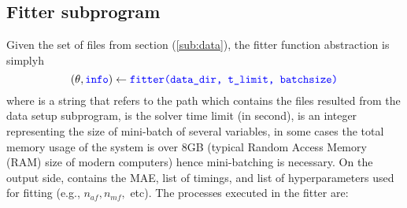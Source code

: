 \documentclass[12pt]{article}
\begin{document}
\subsection{Fitter subprogram}
\label{sub:}
Given the set of files from section (\ref{sub:data}), the fitter function abstraction is simplyh
\begin{equation}
	(\theta, \codeword{info}) \leftarrow \codeword{fitter(data_dir, t_limit, batchsize)}
\end{equation}
where  is a string that refers to the path which contains the files resulted from the data setup subprogram,  is the solver time limit (in second),  is an integer representing the size of mini-batch of several variables, in some cases the total memory usage of the system is over 8GB (typical Random Access Memory (RAM) size of modern computers) hence mini-batching is necessary. On the output side,  contains the MAE, list of timings, and list of hyperparameters used for fitting (e.g., $n_{af}, n_{mf},$ etc). The processes executed in the fitter are:
\end{document}
